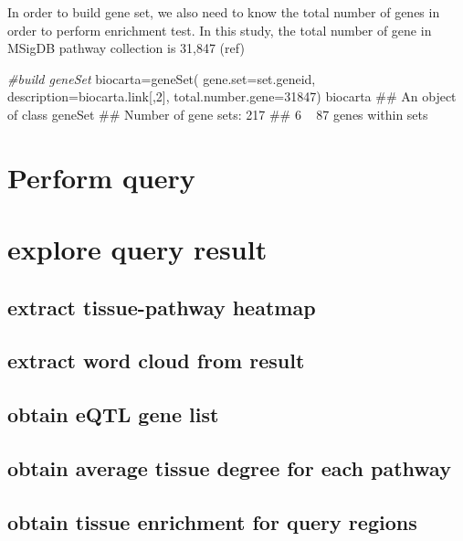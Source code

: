 \documentclass[]{article}
\newcommand{\hlnum}[1]{\textcolor[rgb]{0.816,0.125,0.439}{#1}}%
\newcommand{\hlcom}[1]{\textcolor[rgb]{0.502,0.502,0.502}{\textit{#1}}}%
\newcommand{\hlstd}[1]{\textcolor[rgb]{0.251,0.251,0.251}{#1}}%
\newcommand{\hlkwc}[1]{\textcolor[rgb]{0.251,0.251,0.251}{#1}}%
\newcommand{\hlkwd}[1]{\textcolor[rgb]{0.878,0.439,0.125}{#1}}%
\newenvironment{Shaded}{\begin{myshaded}}{\end{myshaded}}
\newcommand{\KeywordTok}[1]{\hlkwd{#1}}
\newcommand{\DataTypeTok}[1]{\hlkwc{#1}}
\newcommand{\DecValTok}[1]{\hlnum{#1}}
\newcommand{\CommentTok}[1]{\hlcom{#1}}
\newcommand{\NormalTok}[1]{\hlstd{#1}}
\theoremstyle{definition}
\theoremstyle{definition}
\theoremstyle{remark}
\begin{document}
In order to build gene set, we also need to know the total number of
genes in order to perform enrichment test. In this study, the total
number of gene in MSigDB pathway collection is 31,847 (ref)

\begin{Shaded}
\begin{Highlighting}[]
\CommentTok{#build geneSet}
\NormalTok{biocarta=}\KeywordTok{geneSet}\NormalTok{(}
  \DataTypeTok{gene.set=}\NormalTok{set.geneid,}
  \DataTypeTok{description=}\NormalTok{biocarta.link[,}\DecValTok{2}\NormalTok{],}
  \DataTypeTok{total.number.gene=}\DecValTok{31847}\NormalTok{)}
\NormalTok{biocarta}
\NormalTok{## An object of class geneSet}
\NormalTok{##  Number of gene sets: 217 }
\NormalTok{##     6 ~ 87  genes within sets}
\end{Highlighting}
\end{Shaded}

\section{Perform query}\label{perform-query}

\section{explore query result}\label{explore-query-result}

\subsection{extract tissue-pathway
heatmap}\label{extract-tissue-pathway-heatmap}

\subsection{extract word cloud from
result}\label{extract-word-cloud-from-result}

\subsection{obtain eQTL gene list}\label{obtain-eqtl-gene-list}

\subsection{obtain average tissue degree for each
pathway}\label{obtain-average-tissue-degree-for-each-pathway}

\subsection{obtain tissue enrichment for query
regions}\label{obtain-tissue-enrichment-for-query-regions}
\end{document}
